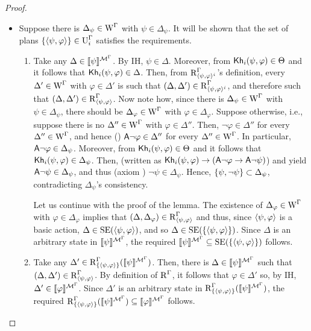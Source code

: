 \begin{proof}
\begin{itemize}
\begin{itemize}
\item Suppose there is $\Delta_\psi \in \operatorname{W}^\Gamma$ with $\psi \in \Delta_\psi$. It will be shown that the set of plans $\{ \langle \psi, \varphi \rangle \} \in \operatorname{U}^\Gamma_i$ satisfies the requirements.
\begin{enumerate}
\item Take any $\Delta \in \llbracket \psi \rrbracket^{\mathcal{M}^\Gamma}$. By IH, $\psi \in \Delta$.
Moreover, from ${\sf Kh}_i(\psi, \varphi) \in \Theta$ and  it follows that ${\sf Kh}_i(\psi, \varphi) \in \Delta$.
Then, from $\operatorname{R}^\Gamma_{\langle \psi,\varphi \rangle^i}$'s definition, every $\Delta' \in \operatorname{W}^\Gamma$ with $\varphi \in \Delta'$ is such that $(\Delta, \Delta') \in \operatorname{R}^\Gamma_{\langle \psi,\varphi \rangle^i}$, and therefore such that $(\Delta, \Delta') \in \operatorname{R}^\Gamma_{\langle \psi,\varphi \rangle}$.
Now note how, since there is $\Delta_\psi \in \operatorname{W}^\Gamma$ with $\psi \in \Delta_\psi$, there should be $\Delta_\varphi \in \operatorname{W}^\Gamma$ with $\varphi \in \Delta_\varphi$.
Suppose otherwise, i.e., suppose there is no $\Delta'' \in \operatorname{W}^\Gamma$ with $\varphi \in \Delta''$. Then, $\lnot \varphi \in \Delta''$ for every $\Delta'' \in \operatorname{W}^\Gamma$, and hence () ${\sf A}\lnot\varphi \in \Delta''$ for every $\Delta'' \in \operatorname{W}^\Gamma$.
In particular, ${\sf A}\lnot\varphi \in \Delta_\psi$. Moreover, from ${\sf Kh}_i(\psi, \varphi) \in \Theta$ and  it follows that ${\sf Kh}_i(\psi, \varphi) \in \Delta_\psi$. Then,  (written as ${\sf Kh}_i(\psi, \varphi) \rightarrow ({\sf A}\lnot \varphi \rightarrow {\sf A} \lnot \psi)$) and  yield ${\sf A}\lnot\psi \in \Delta_\psi$, and thus (axiom ) $\lnot\psi \in \Delta_\psi$.
Hence, $\{ \psi, \lnot\psi \} \subset \Delta_\psi$, contradicting $\Delta_\psi$'s consistency.

Let us continue with the proof of the lemma. The existence of $\Delta_\varphi \in \operatorname{W}^\Gamma$ with $\varphi \in \Delta_\varphi$ implies that $(\Delta, \Delta_\varphi) \in \operatorname{R}^\Gamma_{\langle \psi,\varphi \rangle}$ and thus, since $\langle \psi,\varphi \rangle$ is a basic action, $\Delta \in \operatorname{SE}(\langle \psi,\varphi \rangle)$, and so $\Delta \in \operatorname{SE}(\{ \langle \psi,\varphi \rangle \})$. Since $\Delta$ is an arbitrary state in $\llbracket \psi \rrbracket^{\mathcal{M}^\Gamma}$, the required $\llbracket \psi \rrbracket^{\mathcal{M}^\Gamma} \subseteq \operatorname{SE}(\{ \langle \psi,\varphi \rangle \})$ follows.

\item Take any $\Delta' \in \operatorname{R}^\Gamma_{\{ \langle \psi,\varphi \rangle \}}(\llbracket \psi \rrbracket^{\mathcal{M}^\Gamma})$. Then, there is $\Delta \in \llbracket \psi \rrbracket^{\mathcal{M}^\Gamma}$ such that $(\Delta, \Delta') \in \operatorname{R}^\Gamma_{\langle \psi,\varphi \rangle}$. By definition of $\operatorname{R}^\Gamma$, it follows that $\varphi \in \Delta'$ so, by IH, $\Delta' \in \llbracket \varphi \rrbracket^{\mathcal{M}^\Gamma}$. Since $\Delta'$ is an arbitrary state in $\operatorname{R}^\Gamma_{\{ \langle \psi,\varphi \rangle \}}(\llbracket \psi \rrbracket^{\mathcal{M}^\Gamma})$, the required $\operatorname{R}^\Gamma_{\{ \langle \psi,\varphi \rangle \}}(\llbracket \psi \rrbracket^{\mathcal{M}^\Gamma}) \subseteq \llbracket \varphi \rrbracket^{\mathcal{M}^\Gamma}$ follows.
\end{enumerate}
\end{itemize}
\end{itemize}
\end{proof}

